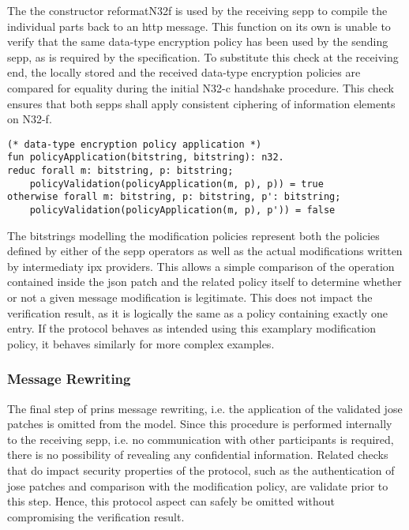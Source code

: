 The the constructor {\sffamily reformatN32f} is used by the receiving \gls{sepp} to compile the individual parts back to an \gls{http} message.
This function on its own is unable to verify that the same data-type encryption policy has been used by the sending \gls{sepp}, as is required by the specification.
To substitute this check at the receiving end, the locally stored and the received data-type encryption policies are compared for equality during the initial N32-c handshake procedure.
This check ensures that both \glspl{sepp} shall apply consistent ciphering of information elements on N32-f.

\begin{lstlisting}[caption={N32-f message rewriting},label={lst:n32f-rewriting},firstnumber=105]
(* data-type encryption policy application *)
fun policyApplication(bitstring, bitstring): n32.
reduc forall m: bitstring, p: bitstring;
    policyValidation(policyApplication(m, p), p)) = true
otherwise forall m: bitstring, p: bitstring, p': bitstring;
    policyValidation(policyApplication(m, p), p')) = false
\end{lstlisting}

The bitstrings modelling the modification policies represent both the policies defined by either of the \gls{sepp} operators as well as the actual modifications written by intermediaty \gls{ipx} providers.
This allows a simple comparison of the operation contained inside the \gls{json} patch and the related policy itself to determine whether or not a given message modification is legitimate.
This does not impact the verification result, as it is logically the same as a policy containing exactly one entry.
If the protocol behaves as intended using this examplary modification policy, it behaves similarly for more complex examples.

\subsubsection{Message Rewriting}

The final step of \gls{prins} message rewriting, i.e. the application of the validated \gls{jose} patches is omitted from the model.
Since this procedure is performed internally to the receiving \gls{sepp}, i.e. no communication with other participants is required, there is no possibility of revealing any confidential information.
Related checks that do impact security properties of the protocol, such as the authentication of \gls{jose} patches and comparison with the modification policy, are validate prior to this step.
Hence, this protocol aspect can safely be omitted without compromising the verification result.


